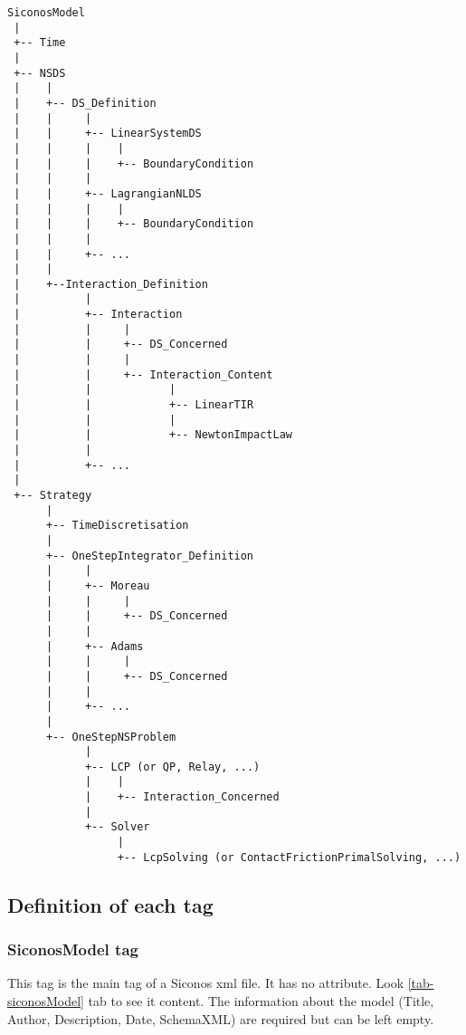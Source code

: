\begin{verbatim}
SiconosModel
 |
 +-- Time
 |
 +-- NSDS
 |    |
 |    +-- DS_Definition
 |    |     |
 |    |     +-- LinearSystemDS
 |    |     |    |
 |    |     |    +-- BoundaryCondition
 |    |     |
 |    |     +-- LagrangianNLDS
 |    |     |    |
 |    |     |    +-- BoundaryCondition
 |    |     |
 |    |     +-- ...
 |    |
 |    +--Interaction_Definition
 |          |
 |          +-- Interaction
 |          |     |
 |          |     +-- DS_Concerned
 |          |     |
 |          |     +-- Interaction_Content
 |          |            |
 |          |            +-- LinearTIR
 |          |            |
 |          |            +-- NewtonImpactLaw
 |          |
 |          +-- ...
 |    
 +-- Strategy
      |
      +-- TimeDiscretisation
      |
      +-- OneStepIntegrator_Definition
      |     |
      |     +-- Moreau
      |     |     |
      |     |     +-- DS_Concerned
      |     |
      |     +-- Adams
      |     |     |
      |     |     +-- DS_Concerned
      |     |
      |     +-- ...
      |
      +-- OneStepNSProblem
            |
            +-- LCP (or QP, Relay, ...)
            |    |
            |    +-- Interaction_Concerned
            |
            +-- Solver
                 |
                 +-- LcpSolving (or ContactFrictionPrimalSolving, ...)
\end{verbatim}


\subsection{Definition of each tag}



\subsubsection{SiconosModel tag}

This tag is the main tag of a Siconos \ac{xml} file. It has no attribute. Look \ref{tab-siconosModel} tab to see it content.
The information about the model (Title, Author, Description, Date, SchemaXML) are required but can be left empty.

